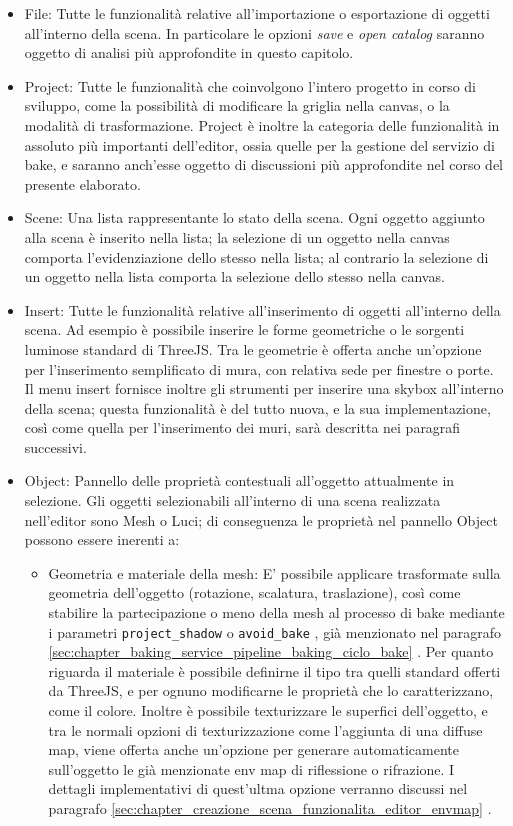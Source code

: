 \begin{itemize}
\item File: Tutte le funzionalità relative all’importazione o esportazione di oggetti all’interno della scena. In particolare le opzioni \emph{save} e \emph{open catalog} saranno oggetto di analisi più approfondite in questo capitolo.
\item Project: Tutte le funzionalità che coinvolgono l’intero progetto in corso di sviluppo, come la possibilità di modificare la griglia nella canvas, o la modalità di trasformazione. Project è inoltre la categoria delle funzionalità in assoluto più importanti dell’editor, ossia quelle per la gestione del servizio di bake, e saranno anch’esse oggetto di discussioni più approfondite nel corso del presente elaborato.
\item Scene: Una lista rappresentante lo stato della scena. Ogni oggetto aggiunto alla scena è inserito nella lista; la selezione di un oggetto nella canvas comporta l’evidenziazione dello stesso nella lista; al contrario la selezione di un oggetto nella lista comporta la selezione dello stesso nella canvas. 
\item Insert: Tutte le funzionalità relative all’inserimento di oggetti all’interno della scena. Ad esempio è possibile inserire le forme geometriche o le sorgenti luminose standard di ThreeJS. Tra le geometrie è offerta anche un’opzione per l’inserimento semplificato di mura, con relativa sede per finestre o porte.
\\
Il menu insert fornisce inoltre gli strumenti per inserire una skybox all’interno della scena; questa funzionalità è del tutto nuova, e la sua implementazione, così come quella per l’inserimento dei muri, sarà descritta nei paragrafi successivi.
\item Object: Pannello delle proprietà contestuali all’oggetto attualmente in selezione. Gli oggetti selezionabili all’interno di una scena realizzata nell’editor sono Mesh o Luci; di conseguenza le proprietà nel pannello Object possono essere inerenti a:
\begin{itemize}
\item Geometria e materiale della mesh: E’ possibile applicare trasformate sulla geometria dell’oggetto (rotazione, scalatura, traslazione), così come stabilire la partecipazione o meno della mesh al processo di bake mediante i parametri \texttt{project\_shadow} o \texttt{avoid\_bake} , già menzionato nel paragrafo \ref{sec:chapter_baking_service_pipeline_baking_ciclo_bake} . Per quanto riguarda il materiale è possibile definirne il tipo tra quelli standard offerti da ThreeJS, e per ognuno modificarne le proprietà che lo caratterizzano, come il colore. Inoltre è possibile texturizzare le superfici dell’oggetto, e tra le normali opzioni di texturizzazione come l’aggiunta di una diffuse map, viene offerta anche un’opzione per generare automaticamente sull’oggetto le già menzionate env map di riflessione o rifrazione. I dettagli implementativi di quest’ultma opzione verranno discussi nel paragrafo \ref{sec:chapter_creazione_scena_funzionalita_editor_envmap} .

\end{itemize}
\end{itemize}

